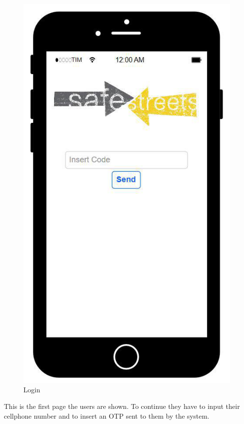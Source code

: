 \begin{figure} [H]
    \includegraphics[scale=0.5]{Images/Templates/User/us_2.png}
    \caption{\label{fig:Mockup-1}Login}
\end{figure}

This is the first page the users are shown. To continue they 
have to input their cellphone number and to insert an OTP 
sent to them by the system.

